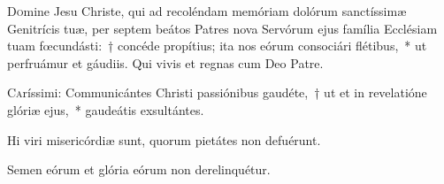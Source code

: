 \documentclass[vesperale_romanum.tex]{subfiles}
\begin{document}
\bmvtone


\omniapraeter

\hymnus
\label{hy_omnis_expertem_solesmes_1961}
{}



\myrule



\duplex





\oratio

\lettrine{D}{o}mine Jesu Christe, qui ad recoléndam memóriam dolórum sanctíssimæ Genitrícis tuæ, per septem beátos Patres nova Servórum ejus família Ecclésiam tuam fœcundásti:~† concéde propítius; ita nos eórum consociári flétibus,~* ut perfruámur et gáudiis. Qui vivis et regnas cum Deo Patre.

\quadcommferiae



\lettrine{C}{a}ríssimi: Communicántes Christi passiónibus gaudéte,~† ut et in revelatióne glóriæ ejus,~* gaudeátis exsultántes.

\hymnus


\vv Hi viri misericórdiæ sunt, quorum pietátes non defuérunt.

\rr Semen eórum et glória eórum non derelinquétur.


\quadcommferiae

\myrule
\end{document}
